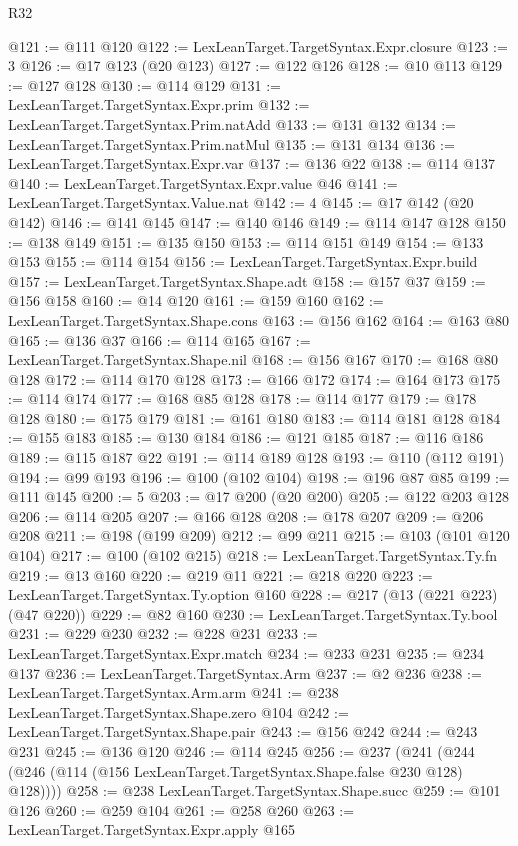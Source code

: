 \begin{lexlean}{R32}
\begin{coremodule}
@121 := @111 @120
@122 := LexLeanTarget.TargetSyntax.Expr.closure
@123 := 3
@126 := @17 @123 (@20 @123)
@127 := @122 @126
@128 := @10 @113
@129 := @127 @128
@130 := @114 @129
@131 := LexLeanTarget.TargetSyntax.Expr.prim
@132 := LexLeanTarget.TargetSyntax.Prim.natAdd
@133 := @131 @132
@134 := LexLeanTarget.TargetSyntax.Prim.natMul
@135 := @131 @134
@136 := LexLeanTarget.TargetSyntax.Expr.var
@137 := @136 @22
@138 := @114 @137
@140 := LexLeanTarget.TargetSyntax.Expr.value @46
@141 := LexLeanTarget.TargetSyntax.Value.nat
@142 := 4
@145 := @17 @142 (@20 @142)
@146 := @141 @145
@147 := @140 @146
@149 := @114 @147 @128
@150 := @138 @149
@151 := @135 @150
@153 := @114 @151 @149
@154 := @133 @153
@155 := @114 @154
@156 := LexLeanTarget.TargetSyntax.Expr.build
@157 := LexLeanTarget.TargetSyntax.Shape.adt
@158 := @157 @37
@159 := @156 @158
@160 := @14 @120
@161 := @159 @160
@162 := LexLeanTarget.TargetSyntax.Shape.cons
@163 := @156 @162
@164 := @163 @80
@165 := @136 @37
@166 := @114 @165
@167 := LexLeanTarget.TargetSyntax.Shape.nil
@168 := @156 @167
@170 := @168 @80 @128
@172 := @114 @170 @128
@173 := @166 @172
@174 := @164 @173
@175 := @114 @174
@177 := @168 @85 @128
@178 := @114 @177
@179 := @178 @128
@180 := @175 @179
@181 := @161 @180
@183 := @114 @181 @128
@184 := @155 @183
@185 := @130 @184
@186 := @121 @185
@187 := @116 @186
@189 := @115 @187 @22
@191 := @114 @189 @128
@193 := @110 (@112 @191)
@194 := @99 @193
@196 := @100 (@102 @104)
@198 := @196 @87 @85
@199 := @111 @145
@200 := 5
@203 := @17 @200 (@20 @200)
@205 := @122 @203 @128
@206 := @114 @205
@207 := @166 @128
@208 := @178 @207
@209 := @206 @208
@211 := @198 (@199 @209)
@212 := @99 @211
@215 := @103 (@101 @120 @104)
@217 := @100 (@102 @215)
@218 := LexLeanTarget.TargetSyntax.Ty.fn
@219 := @13 @160
@220 := @219 @11
@221 := @218 @220
@223 := LexLeanTarget.TargetSyntax.Ty.option @160
@228 := @217 (@13 (@221 @223) (@47 @220))
@229 := @82 @160
@230 := LexLeanTarget.TargetSyntax.Ty.bool
@231 := @229 @230
@232 := @228 @231
@233 := LexLeanTarget.TargetSyntax.Expr.match
@234 := @233 @231
@235 := @234 @137
@236 := LexLeanTarget.TargetSyntax.Arm
@237 := @2 @236
@238 := LexLeanTarget.TargetSyntax.Arm.arm
@241 := @238 LexLeanTarget.TargetSyntax.Shape.zero @104
@242 := LexLeanTarget.TargetSyntax.Shape.pair
@243 := @156 @242
@244 := @243 @231
@245 := @136 @120
@246 := @114 @245
@256 := @237
    (@241 (@244 (@246 (@114 (@156 LexLeanTarget.TargetSyntax.Shape.false @230 @128) @128))))
@258 := @238 LexLeanTarget.TargetSyntax.Shape.succ
@259 := @101 @126
@260 := @259 @104
@261 := @258 @260
@263 := LexLeanTarget.TargetSyntax.Expr.apply @165

\end{coremodule}
\end{lexlean}
